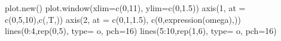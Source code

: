 \documentclass[
  letterpaper,
  DIV=11,
  numbers=noendperiod]{scrartcl}
\newenvironment{Shaded}{\begin{snugshade}}{\end{snugshade}}
\newcommand{\AttributeTok}[1]{\textcolor[rgb]{0.40,0.45,0.13}{#1}}
\newcommand{\DecValTok}[1]{\textcolor[rgb]{0.68,0.00,0.00}{#1}}
\newcommand{\FloatTok}[1]{\textcolor[rgb]{0.68,0.00,0.00}{#1}}
\newcommand{\FunctionTok}[1]{\textcolor[rgb]{0.28,0.35,0.67}{#1}}
\newcommand{\NormalTok}[1]{\textcolor[rgb]{0.00,0.23,0.31}{#1}}
\newcommand{\SpecialCharTok}[1]{\textcolor[rgb]{0.37,0.37,0.37}{#1}}
\newcommand{\StringTok}[1]{\textcolor[rgb]{0.13,0.47,0.30}{#1}}
\theoremstyle{plain}
\theoremstyle{plain}
\theoremstyle{definition}
\theoremstyle{definition}
\theoremstyle{remark}
\begin{document}
\begin{Shaded}
\begin{Highlighting}[]
\FunctionTok{plot.new}\NormalTok{()}
\FunctionTok{plot.window}\NormalTok{(}\AttributeTok{xlim=}\FunctionTok{c}\NormalTok{(}\DecValTok{0}\NormalTok{,}\DecValTok{11}\NormalTok{), }\AttributeTok{ylim=}\FunctionTok{c}\NormalTok{(}\DecValTok{0}\NormalTok{,}\FloatTok{1.5}\NormalTok{))}
\FunctionTok{axis}\NormalTok{(}\DecValTok{1}\NormalTok{, }\AttributeTok{at =} \FunctionTok{c}\NormalTok{(}\DecValTok{0}\NormalTok{,}\DecValTok{5}\NormalTok{,}\DecValTok{10}\NormalTok{),}\FunctionTok{c}\NormalTok{(}\StringTok{\textquotesingle{}\textquotesingle{}}\NormalTok{,}\StringTok{\textquotesingle{}T\textquotesingle{}}\NormalTok{,}\StringTok{\textquotesingle{}\textquotesingle{}}\NormalTok{))}
\FunctionTok{axis}\NormalTok{(}\DecValTok{2}\NormalTok{, }\AttributeTok{at =} \FunctionTok{c}\NormalTok{(}\DecValTok{0}\NormalTok{,}\DecValTok{1}\NormalTok{,}\FloatTok{1.5}\NormalTok{), }\FunctionTok{c}\NormalTok{(}\DecValTok{0}\NormalTok{,}\FunctionTok{expression}\NormalTok{(omega),}\StringTok{\textquotesingle{}\textquotesingle{}}\NormalTok{))}
\FunctionTok{lines}\NormalTok{(}\DecValTok{0}\SpecialCharTok{:}\DecValTok{4}\NormalTok{,}\FunctionTok{rep}\NormalTok{(}\DecValTok{0}\NormalTok{,}\DecValTok{5}\NormalTok{), }\AttributeTok{type=} \StringTok{\textquotesingle{}o\textquotesingle{}}\NormalTok{, }\AttributeTok{pch=}\DecValTok{16}\NormalTok{)}
\FunctionTok{lines}\NormalTok{(}\DecValTok{5}\SpecialCharTok{:}\DecValTok{10}\NormalTok{,}\FunctionTok{rep}\NormalTok{(}\DecValTok{1}\NormalTok{,}\DecValTok{6}\NormalTok{), }\AttributeTok{type=} \StringTok{\textquotesingle{}o\textquotesingle{}}\NormalTok{, }\AttributeTok{pch=}\DecValTok{16}\NormalTok{)}
\end{Highlighting}
\end{Shaded}
\end{document}
